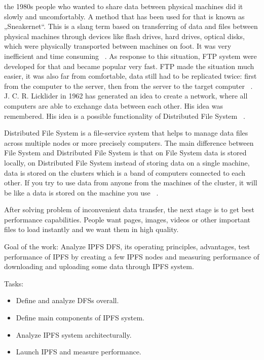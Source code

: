  the 1980s people who wanted to share data between physical machines did it slowly and uncomfortably. A method that has been used for that is known as „Sneakernet“. This is a slang term based on transferring of data and files between physical machines through devices like flash drives, hard drives, optical disks, which were physically transported between machines on foot. It was very inefficient and time consuming ~\cite{fleishman2009take}. As response to this situation, FTP system were developed for that and became popular very fast. FTP made the situation much easier, it was also far from comfortable, data still had to be replicated twice: first from the computer to the server, then from the server to the target computer ~\cite{eriksen2005comparison}. J. C. R. Licklider in 1962 has generated an idea to create a network, where all computers are able to exchange data between each other. His idea was remembered. His idea is a possible functionality of Distributed File System ~\cite{licklider1968memoriam}.

Distributed File System is a file-service system that helps to manage data files across multiple nodes or more precisely computers. The main difference between File System and Distributed File System is that on File System data is stored locally, on Distributed File System instead of storing data on a single machine, data is stored on the clusters which is a band of computers connected to each other. If you try to use data from anyone from the machines of the cluster, it will be like a data is stored on the machine you use ~\cite{ponnavaikko2009edge}.

After solving problem of inconvenient data transfer, the next stage is to get best performance capabilities. People want pages, images, videos or other important files to load instantly and we want them in high quality.

Goal of the work: Analyze IPFS DFS, its operating principles, advantages, test performance of IPFS by creating a few IPFS nodes and measuring performance of downloading and uploading some data through IPFS system.

\bigskip
Tasks:
\begin{itemize}
    \item Define and analyze DFSs overall.
    \item Define main components of IPFS system.
	\item Analyze IPFS system architecturally.
	\item Launch IPFS and measure performance.
\end{itemize}

